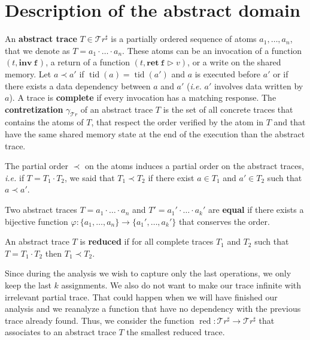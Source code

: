 \documentclass{llncs}
\newcommand{\inv}[1]{\mathbf{inv}\ \mathtt{#1}}
\newcommand{\ret}[2]{\mathbf{ret}\ \mathtt{#1} \vartriangleright #2}
\newcommand{\Traces}{\mathcal T\!r}
\newcommand{\aTraces}{\mathcal T\!r^\sharp}
\DeclareMathOperator{\tid}{tid}
\DeclareMathOperator{\red}{red}
\begin{document}
\section{Description of the abstract domain}

\begin{definition}
	An \textbf{abstract trace} $T \in \aTraces$ is a partially ordered sequence of atoms $a_1, \dots, a_n$, that we denote as $T = a_1 \cdot \ldots \cdot a_n$. These atoms can be an invocation of a function $(t, \inv{f})$, a return of a function $(t, \ret{f}{v})$, or a write on the shared memory. Let $a \prec a'$ if $\tid(a) = \tid(a')$ and $a$ is executed before $a'$ or if there exists a data dependency between $a$ and $a'$ (\emph{i.e.} $a'$ involves data written by $a$). A trace is \textbf{complete} if every invocation has a matching response. The \textbf{contretization} $\gamma_{\Traces}$ of an abstract trace $T$ is the set of all concrete traces that contains the atoms of $T$, that respect the order verified by the atom in $T$ and that have the same shared memory state at the end of the execution than the abstract trace.
\end{definition}

The partial order $\prec$ on the atoms induces a partial order on the abstract traces, \textit{i.e.} if $T = T_1 \cdot T_2$, we said that $T_1 \prec T_2$ if there exist $a\in T_1$ and $a' \in T_2$ such that $a\prec a'$. 


\begin{definition}
		Two abstract traces $T = a_1 \cdot \ldots \cdot a_n$ and $T' = a_1' \cdot \ldots \cdot a_k'$ are \textbf{equal} if there exists a bijective function $\varphi : \{a_1,\dots,a_n\} \rightarrow \{a_1',\dots, a_k'\}$ that conserves the order. 
\end{definition}

\begin{definition}
	An abstract trace $T$ is \textbf{reduced} if for all complete traces $T_1$ and $T_2$ such that $T=T_1\cdot T_2$ then $T_1 \prec T_2$. 
\end{definition}



Since during the analysis we wish to capture only the last operations, we only keep the last $k$ assignments. We also do not want to make our trace infinite with irrelevant partial trace. That could happen when we will have finished our analysis and we reanalyze a function that have no dependency with the previous trace already found. Thus, we consider the function $\red : \aTraces \rightarrow \aTraces$ that associates to an abstract trace $T$ the smallest reduced trace. 
\end{document}
